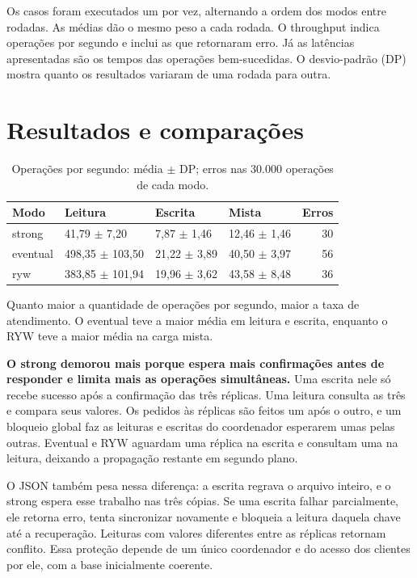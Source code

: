 Os casos foram executados um por vez, alternando a ordem dos modos entre
rodadas. As médias dão o mesmo peso a cada rodada. O throughput indica
operações por segundo e inclui as que retornaram erro. Já as latências
apresentadas são os tempos das operações bem-sucedidas. O desvio-padrão
(DP) mostra quanto os resultados variaram de uma rodada para outra.

\section{Resultados e comparações}

\begin{table}[htbp]
\centering\small
\setlength{\tabcolsep}{4pt}
\caption{Operações por segundo: média $\pm$ DP; erros nas 30.000 operações de cada modo.}
\begin{tabular}{llllr}
\toprule
Modo & Leitura & Escrita & Mista & Erros\\\midrule
strong & 41,79 $\pm$ 7,20 & 7,87 $\pm$ 1,46 & 12,46 $\pm$ 1,46 & 30\\
eventual & 498,35 $\pm$ 103,50 & 21,22 $\pm$ 3,89 & 40,50 $\pm$ 3,97 & 56\\
ryw & 383,85 $\pm$ 101,94 & 19,96 $\pm$ 3,62 & 43,58 $\pm$ 8,48 & 36\\
\bottomrule
\end{tabular}
\end{table}

Quanto maior a quantidade de operações por segundo, maior a taxa de atendimento.
O eventual teve a maior média em leitura e escrita, enquanto o RYW teve a
maior média na carga mista.

\textbf{O strong demorou mais porque espera mais confirmações antes de
responder e limita mais as operações simultâneas.} Uma escrita nele só
recebe sucesso após a confirmação das três réplicas. Uma leitura consulta
as três e compara seus valores. Os pedidos às réplicas são feitos um após
o outro, e um bloqueio global faz as leituras e escritas do coordenador
esperarem umas pelas outras. Eventual e RYW aguardam uma réplica na escrita
e consultam uma na leitura, deixando a propagação restante em segundo plano.

O JSON também pesa nessa diferença: a escrita regrava o arquivo inteiro,
e o strong espera esse trabalho nas três cópias. Se uma escrita falhar
parcialmente, ele retorna erro, tenta sincronizar novamente e bloqueia a
leitura daquela chave até a recuperação. Leituras com valores diferentes
entre as réplicas retornam conflito. Essa proteção depende de um único
coordenador e do acesso dos clientes por ele, com a base inicialmente coerente.

